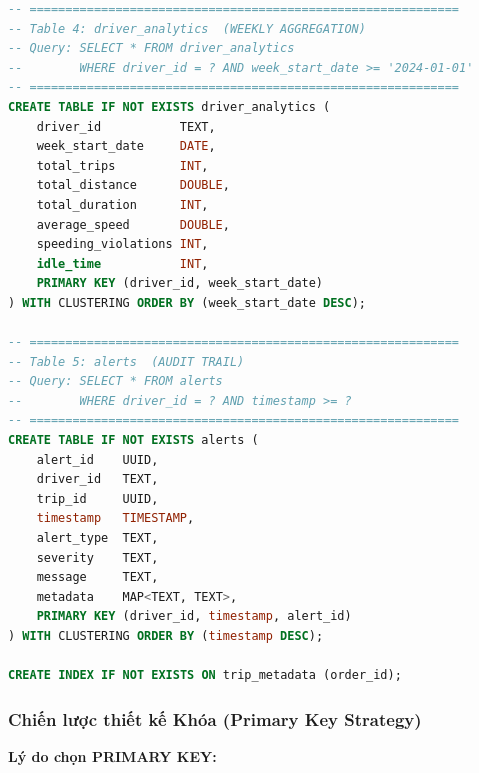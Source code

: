 \begin{lstlisting}[language=SQL, caption={Cassandra Schema — \texttt{init-cql.cql}: Keyspace và 5 bảng chính}, label={lst:cql-schema}]
-- ============================================================
-- Table 4: driver_analytics  (WEEKLY AGGREGATION)
-- Query: SELECT * FROM driver_analytics
--        WHERE driver_id = ? AND week_start_date >= '2024-01-01'
-- ============================================================
CREATE TABLE IF NOT EXISTS driver_analytics (
    driver_id           TEXT,
    week_start_date     DATE,
    total_trips         INT,
    total_distance      DOUBLE,
    total_duration      INT,
    average_speed       DOUBLE,
    speeding_violations INT,
    idle_time           INT,
    PRIMARY KEY (driver_id, week_start_date)
) WITH CLUSTERING ORDER BY (week_start_date DESC);

-- ============================================================
-- Table 5: alerts  (AUDIT TRAIL)
-- Query: SELECT * FROM alerts
--        WHERE driver_id = ? AND timestamp >= ?
-- ============================================================
CREATE TABLE IF NOT EXISTS alerts (
    alert_id    UUID,
    driver_id   TEXT,
    trip_id     UUID,
    timestamp   TIMESTAMP,
    alert_type  TEXT,
    severity    TEXT,
    message     TEXT,
    metadata    MAP<TEXT, TEXT>,
    PRIMARY KEY (driver_id, timestamp, alert_id)
) WITH CLUSTERING ORDER BY (timestamp DESC);

CREATE INDEX IF NOT EXISTS ON trip_metadata (order_id);
\end{lstlisting}

\subsubsection{Chiến lược thiết kế Khóa (Primary Key Strategy)}
\label{sec:cassandra-keys}

\textbf{Lý do chọn PRIMARY KEY:}

